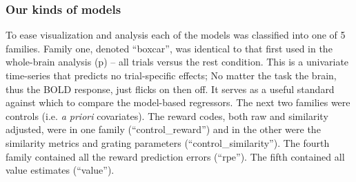 \documentclass[doc,12pt]{apa}        %
\begin{document}
\subsubsection{Our kinds of models}
\label{subsub:ourkinds}
To ease visualization and analysis each of the models was classified into one of 5 families.  Family one, denoted ``boxcar'', was identical to that first used in the whole-brain analysis (p\pageref{sub:blob}) -- all trials versus the rest condition.  This is a univariate time-series that predicts no trial-specific effects; No matter the task the brain, thus the BOLD response, just flicks on then off.  It serves as a useful standard against which to compare the model-based regressors.  The next two families were controls (i.e. \emph{a priori} covariates). The reward codes, both raw and similarity adjusted, were in one family (``control\_reward'') and in the other were the similarity metrics and grating parameters (``control\_similarity'').  The fourth family contained all the reward prediction errors (``rpe'').  The fifth contained all value estimates (``value'').
\end{document}
